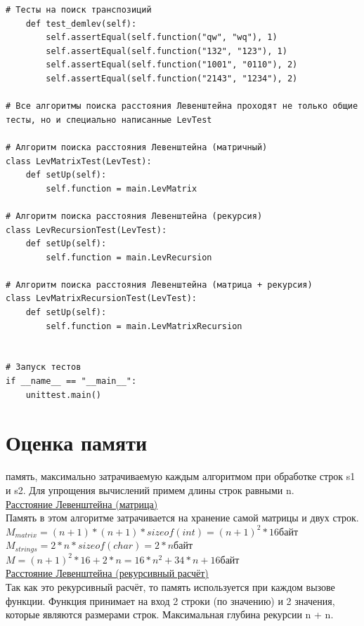 \documentclass[12pt]{report}
\begin{document}
\begin{lstlisting}[label=some-code, caption = Тесты]
	# Тесты на поиск транспозиций
	def test_demlev(self):
		self.assertEqual(self.function("qw", "wq"), 1)
		self.assertEqual(self.function("132", "123"), 1)
		self.assertEqual(self.function("1001", "0110"), 2)
		self.assertEqual(self.function("2143", "1234"), 2)
	
# Все алгоритмы поиска расстояния Левенштейна проходят не только общие тесты, но и специально написанные LevTest
	
# Алгоритм поиска расстояния Левенштейна (матричный)
class LevMatrixTest(LevTest):
	def setUp(self):
		self.function = main.LevMatrix
	
# Алгоритм поиска расстояния Левенштейна (рекурсия)
class LevRecursionTest(LevTest):
	def setUp(self):
		self.function = main.LevRecursion

# Алгоритм поиска расстояния Левенштейна (матрица + рекурсия)
class LevMatrixRecursionTest(LevTest):
	def setUp(self):
		self.function = main.LevMatrixRecursion
	
	
# Запуск тестов
if __name__ == "__main__":
	unittest.main()
\end{lstlisting}

\section{Оценка памяти}
 память, максимально затрачиваемую каждым алгоритмом при обработке строк s1 и s2. Для упрощения вычислений примем длины строк равными n.\\

\underline{Расстояние Левенштейна (матрица)}\\

Память в этом алгоритме затрачивается на хранение самой матрицы и двух строк.\\

$M_{matrix} = (n + 1)*(n + 1)*sizeof(int) = (n + 1)^2 * 16 байт$\\

$M_{strings} = 2*n*sizeof(char) = 2*n байт$\\

$M = (n + 1)^2 * 16 + 2*n = 16 * n^2 + 34 * n + 16 байт$\\

\underline{Расстояние Левенштейна (рекурсивный расчёт)}\\

Так как это рекурсивный расчёт, то память используется при каждом вызове функции. Функция принимает на вход 2 строки (по значению) и 2 значения, которые являются размерами строк. Максимальная глубина рекурсии n + n. \\
\end{document}
